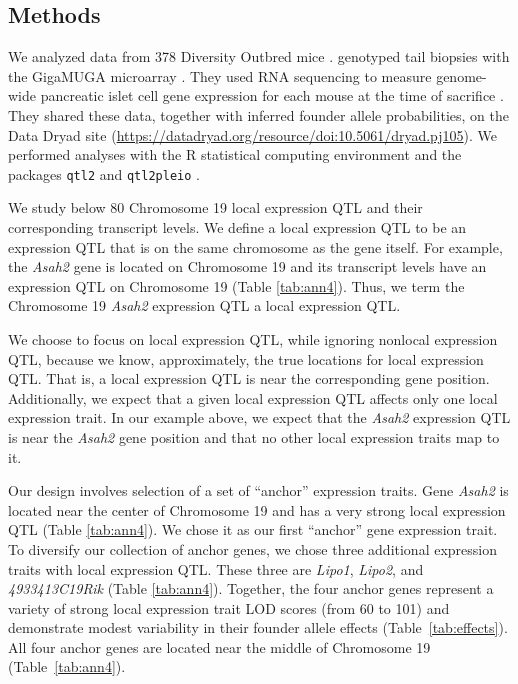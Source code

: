 \documentclass[oneside]{book}\usepackage[]{graphicx}\usepackage[]{color}
\begin{document}
\subsection{Methods}


We analyzed data from 378 Diversity Outbred mice \citep{keller2018genetic}. \citet{keller2018genetic} genotyped tail biopsies with the GigaMUGA microarray \citep{morgan2016mouse}. They used RNA sequencing to measure genome-wide pancreatic islet cell gene expression for each mouse at the time of sacrifice \citep{keller2018genetic}. They shared these data, together with inferred founder allele probabilities, on the Data Dryad site (\url{https://datadryad.org/resource/doi:10.5061/dryad.pj105}). We performed analyses with the R statistical computing environment \citep{r} and the packages \texttt{qtl2} \citep{broman2019rqtl2} and \texttt{qtl2pleio} \citep{qtl2pleio}.


We study below 80 Chromosome 19 local expression QTL and their corresponding transcript levels. We define a local expression QTL to be an expression QTL that is on the same chromosome as the gene itself. For example, the \emph{Asah2} gene is located on Chromosome 19 and its transcript levels have an expression QTL on Chromosome 19 (Table \ref{tab:ann4}). Thus, we term the Chromosome 19 \emph{Asah2} expression QTL a local expression QTL.

We choose to focus on local expression QTL, while ignoring nonlocal expression QTL, 
because we know, approximately, the true locations for local expression QTL. 
That is, a local expression QTL is near the corresponding gene position. 
Additionally, we expect that a given local expression QTL affects only one local expression trait. 
In our example above, we expect that the \emph{Asah2} expression QTL is near the \emph{Asah2} gene 
position and that no other local expression traits map to it.


Our design involves selection of a set of ``anchor'' expression traits. Gene \emph{Asah2} is located near the center of Chromosome 19 and has a very strong local expression QTL (Table \ref{tab:ann4}). We chose it as our first ``anchor'' gene expression trait. To diversify our collection of anchor genes, we chose three additional expression traits with local expression QTL. These three are \emph{Lipo1}, \emph{Lipo2}, and \emph{4933413C19Rik} (Table \ref{tab:ann4}). Together, the four anchor genes represent a variety of strong local expression trait LOD scores (from 60 to 101) and demonstrate modest variability in their founder allele effects (Table~\ref{tab:effects}). All four anchor genes are located near the middle of Chromosome 19 (Table~\ref{tab:ann4}).
\end{document}

